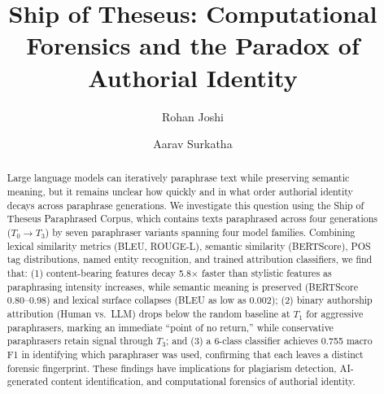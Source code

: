 \documentclass[sigconf]{acmart}
\title{Ship of Theseus: Computational Forensics and the Paradox of Authorial Identity}
\author{Rohan Joshi}
\affiliation{%
  \institution{Northeastern University}
  \city{Seattle}
  \state{Washington}
  \country{USA}
}
\author{Aarav Surkatha}
\affiliation{%
  \institution{Northeastern University}
  \city{Seattle}
  \state{Washington}
  \country{USA}
}
\begin{document}
\begin{abstract}
Large language models can iteratively paraphrase text while preserving semantic meaning, but it remains unclear how quickly and in what order authorial identity decays across paraphrase generations. We investigate this question using the Ship of Theseus Paraphrased Corpus, which contains texts paraphrased across four generations ($T_0 \rightarrow T_3$) by seven paraphraser variants spanning four model families. Combining lexical similarity metrics (BLEU, ROUGE-L), semantic similarity (BERTScore), POS tag distributions, named entity recognition, and trained attribution classifiers, we find that: (1) content-bearing features decay 5.8$\times$ faster than stylistic features as paraphrasing intensity increases, while semantic meaning is preserved (BERTScore 0.80--0.98) and lexical surface collapses (BLEU as low as 0.002); (2) binary authorship attribution (Human vs.\ LLM) drops below the random baseline at $T_1$ for aggressive paraphrasers, marking an immediate ``point of no return,'' while conservative paraphrasers retain signal through $T_3$; and (3) a 6-class classifier achieves 0.755 macro F1 in identifying which paraphraser was used, confirming that each leaves a distinct forensic fingerprint. These findings have implications for plagiarism detection, AI-generated content identification, and computational forensics of authorial identity.
\end{abstract}

\maketitle













\end{document}

